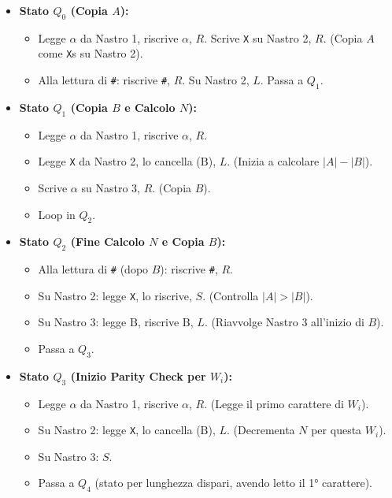 \documentclass[a4paper]{article}
\newcommand{\B}{\text{B}} %
\begin{document}
\begin{itemize}
    \item \textbf{Stato $Q_0$ (Copia $A$):}
        \begin{itemize}
            \item Legge $\alpha$ da Nastro 1, riscrive $\alpha$, $R$. Scrive \texttt{X} su Nastro 2, $R$. (Copia $A$ come \texttt{X}s su Nastro 2).
            \item Alla lettura di \texttt{\#}: riscrive \texttt{\#}, $R$. Su Nastro 2, $L$. Passa a $Q_1$.
        \end{itemize}
    \item \textbf{Stato $Q_1$ (Copia $B$ e Calcolo $N$):}
        \begin{itemize}
            \item Legge $\alpha$ da Nastro 1, riscrive $\alpha$, $R$.
            \item Legge \texttt{X} da Nastro 2, lo cancella ($\B$), $L$. (Inizia a calcolare $|A|-|B|$).
            \item Scrive $\alpha$ su Nastro 3, $R$. (Copia $B$).
            \item Loop in $Q_2$.
        \end{itemize}
    \item \textbf{Stato $Q_2$ (Fine Calcolo $N$ e Copia $B$):}
        \begin{itemize}
            \item Alla lettura di \texttt{\#} (dopo $B$): riscrive \texttt{\#}, $R$.
            \item Su Nastro 2: legge \texttt{X}, lo riscrive, $S$. (Controlla $|A|>|B|$).
            \item Su Nastro 3: legge $\B$, riscrive $\B$, $L$. (Riavvolge Nastro 3 all'inizio di $B$).
            \item Passa a $Q_3$.
        \end{itemize}
    \item \textbf{Stato $Q_3$ (Inizio Parity Check per $W_i$):}
        \begin{itemize}
            \item Legge $\alpha$ da Nastro 1, riscrive $\alpha$, $R$. (Legge il primo carattere di $W_i$).
            \item Su Nastro 2: legge \texttt{X}, lo cancella ($\B$), $L$. (Decrementa $N$ per questa $W_i$).
            \item Su Nastro 3: $S$.
            \item Passa a $Q_4$ (stato per lunghezza dispari, avendo letto il 1° carattere).

\end{itemize}
\end{itemize}
\end{document}
